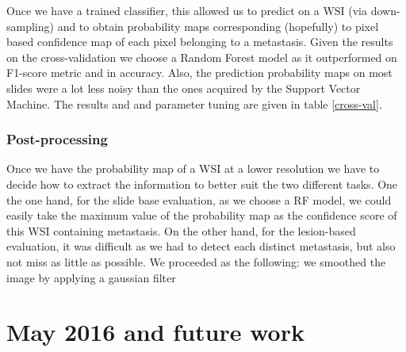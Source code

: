 \documentclass{article}
\begin{document}
Once we have a trained classifier, this allowed us to predict on a WSI (via down-sampling) and to obtain probability maps corresponding (hopefully) to pixel based confidence map of each pixel belonging to a metastasis. Given the results on the cross-validation we choose a Random Forest model as it outperformed on F1-score metric and in accuracy. Also, the prediction probability maps on most slides were a lot less noisy than the ones acquired by the Support Vector Machine. The results and and parameter tuning are given in table \ref{cross-val}.

\subsubsection*{Post-processing}

Once we have the probability map of a WSI at a lower resolution we have to decide how to extract the information to better suit the two different tasks. One the one hand, for the slide base evaluation, as we choose a RF model, we could easily take the maximum value of the probability map as the confidence score of this WSI containing metastasis. On the other hand, for the lesion-based evaluation, it was difficult as we had to detect each distinct metastasis, but also not miss as little as possible. We proceeded as the following: we smoothed the image by applying a gaussian filter


\section{May 2016 and future work}





\newpage
\end{document}
